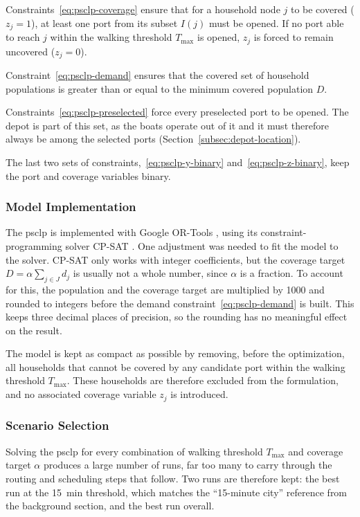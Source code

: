 \documentclass[12pt]{article}
\begin{document}
Constraints~\eqref{eq:psclp-coverage} ensure that for a household node \(j\) to be covered (\(z_j = 1\)), at least one port from its subset \(I(j)\) must be opened. If no port able to reach \(j\) within the walking threshold \(T_{\max}\) is opened, \(z_j\) is forced to remain uncovered (\(z_j = 0\)).

Constraint~\eqref{eq:psclp-demand} ensures that the covered set of household populations is greater than or equal to the minimum covered population \(D\).

Constraints~\eqref{eq:psclp-preselected} force every preselected port to be opened. The depot is part of this set, as the boats operate out of it and it must therefore always be among the selected ports (Section~\ref{subsec:depot-location}).

The last two sets of constraints,~\eqref{eq:psclp-y-binary} and~\eqref{eq:psclp-z-binary}, keep the port and coverage variables binary.

\subsubsection{Model Implementation}
\label{subsubsec:psclp-implementation}

The \ac{psclp} is implemented with Google OR-Tools \parencite{ortools}, using its constraint-programming solver CP-SAT \parencite{cpsat}. One adjustment was needed to fit the model to the solver. CP-SAT only works with integer coefficients, but the coverage target \(D = \alpha \sum_{j \in J} d_j\) is usually not a whole number, since \(\alpha\) is a fraction. To account for this, the population and the coverage target are multiplied by \num{1000} and rounded to integers before the demand constraint~\eqref{eq:psclp-demand} is built. This keeps three decimal places of precision, so the rounding has no meaningful effect on the result.

The model is kept as compact as possible by removing, before the optimization, all households that cannot be covered by any candidate port within the walking threshold \(T_{\max}\). These households are therefore excluded from the formulation, and no associated coverage variable \(z_j\) is introduced.

\subsubsection{Scenario Selection}
\label{subsubsec:scenario-selection}

Solving the \ac{psclp} for every combination of walking threshold \(T_{\max}\) and coverage target \(\alpha\) produces a large number of runs, far too many to carry through the routing and scheduling steps that follow. Two runs are therefore kept: the best run at the \qty{15}{\minute} threshold, which matches the ``15-minute city'' reference from the background section, and the best run overall.
\end{document}
